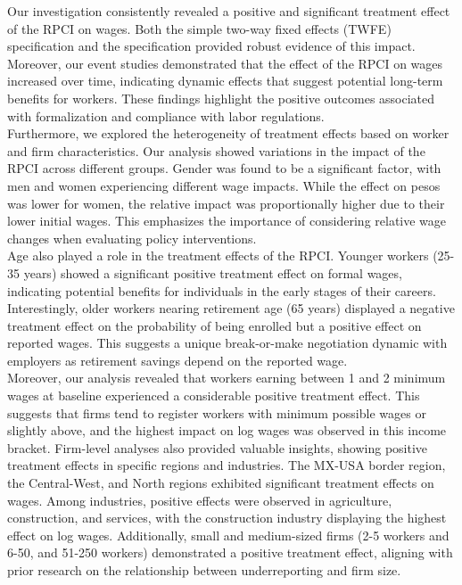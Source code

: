\documentclass[10pt, oneside]{book}
\begin{document}
Our investigation consistently revealed a positive and significant treatment effect of the RPCI on wages. Both the simple two-way fixed effects (TWFE) specification and the \cite{de2020two} specification provided robust evidence of this impact. Moreover, our event studies demonstrated that the effect of the RPCI on wages increased over time, indicating dynamic effects that suggest potential long-term benefits for workers. These findings highlight the positive outcomes associated with formalization and compliance with labor regulations. \\

Furthermore, we explored the heterogeneity of treatment effects based on worker and firm characteristics. Our analysis showed variations in the impact of the RPCI across different groups. Gender was found to be a significant factor, with men and women experiencing different wage impacts. While the effect on pesos was lower for women, the relative impact was proportionally higher due to their lower initial wages. This emphasizes the importance of considering relative wage changes when evaluating policy interventions. \\

Age also played a role in the treatment effects of the RPCI. Younger workers (25-35 years) showed a significant positive treatment effect on formal wages, indicating potential benefits for individuals in the early stages of their careers. Interestingly, older workers nearing retirement age (65 years) displayed a negative treatment effect on the probability of being enrolled but a positive effect on reported wages. This suggests a unique break-or-make negotiation dynamic with employers as retirement savings depend on the reported wage. \\

Moreover, our analysis revealed that workers earning between 1 and 2 minimum wages at baseline experienced a considerable positive treatment effect. This suggests that firms tend to register workers with minimum possible wages or slightly above, and the highest impact on log wages was observed in this income bracket. Firm-level analyses also provided valuable insights, showing positive treatment effects in specific regions and industries. The MX-USA border region, the Central-West, and North regions exhibited significant treatment effects on wages. Among industries, positive effects were observed in agriculture, construction, and services, with the construction industry displaying the highest effect on log wages. Additionally, small and medium-sized firms (2-5 workers and 6-50, and 51-250 workers) demonstrated a positive treatment effect, aligning with prior research on the relationship between underreporting and firm size. \\
\end{document}
